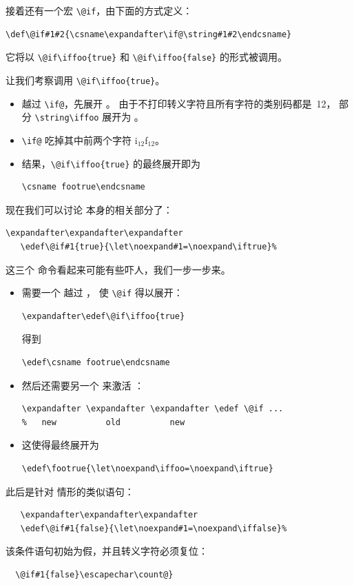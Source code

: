 \documentclass[a4paper]{rapport3}
\begin{document}
接着还有一个宏 \verb>\@if>，由下面的方式定义：
\begin{verbatim}
\def\@if#1#2{\csname\expandafter\if@\string#1#2\endcsname}
\end{verbatim}
它将以 \verb>\@if\iffoo{true}> 和 \verb>\@if\iffoo{false}> 的形式被调用。 

让我们考察调用 \verb>\@if\iffoo{true}>。
\begin{itemize}\item {} 越过 \verb>\if@>，先展开 。
由于不打印转义字符且所有字符的类别码都是~12，
部分 \verb>\string\iffoo> 展开为 。
\item \verb>\if@> 吃掉其中前两个字符 \n i$_{12}$\n f$_{12}$。
\item 结果，\verb>\@if\iffoo{true}> 的最终展开即为 \begin{verbatim}
\csname footrue\endcsname
\end{verbatim}
\end{itemize}

现在我们可以讨论  本身的相关部分了：
\begin{verbatim}
\expandafter\expandafter\expandafter
   \edef\@if#1{true}{\let\noexpand#1=\noexpand\iftrue}%
\end{verbatim}

这三个  命令看起来可能有些吓人，我们一步一步来。
\begin{itemize}\item 需要一个  越过 ，
使 \verb>\@if> 得以展开：
\begin{verbatim}
\expandafter\edef\@if\iffoo{true}
\end{verbatim}
得到
\begin{verbatim}
\edef\csname footrue\endcsname
\end{verbatim}
\item 然后还需要另一个  来激活 \altt
{}：
\begin{verbatim}
\expandafter \expandafter \expandafter \edef \@if ...
%   new          old          new
\end{verbatim}
\item 这使得最终展开为 
\begin{verbatim}
\edef\footrue{\let\noexpand\iffoo=\noexpand\iftrue}
\end{verbatim}
\end{itemize}

此后是针对  情形的类似语句：
\begin{verbatim}
   \expandafter\expandafter\expandafter
   \edef\@if#1{false}{\let\noexpand#1=\noexpand\iffalse}%
\end{verbatim}
该条件语句初始为假，并且转义字符必须复位：
\begin{verbatim}
  \@if#1{false}\escapechar\count@} 
\end{verbatim}
\end{document}
